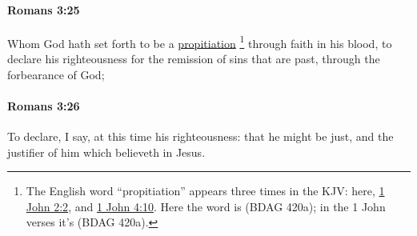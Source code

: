 		\paragraph{Romans 3:25} %
			\label{ROMANS-3-25}

			Whom God hath set forth to be a \hyperref[PROPITIATION]{propitiation}%
				\footnote{%
					The English word ``propitiation'' appears three times in the KJV: here, \hyperref[1JOHN-2-2]{1 John 2:2}, and \hyperref[1JOHN-4-10]{1 John 4:10}. Here the word is  (BDAG 420a); in the 1 John verses it's  (BDAG 420a).
					}
			through faith in his blood, to declare his righteousness for the remission of sins that are past, through the forbearance of God;

			\begin{framed}
			\scriptsize
				\begin{compactdesc}
					\item[SBLG] 
				\end{compactdesc}
			\end{framed}

		\paragraph{Romans 3:26} %
			\label{ROMANS-3-26}

			To declare, I say, at this time his righteousness: that he might be just, and the justifier of him which believeth in Jesus.

